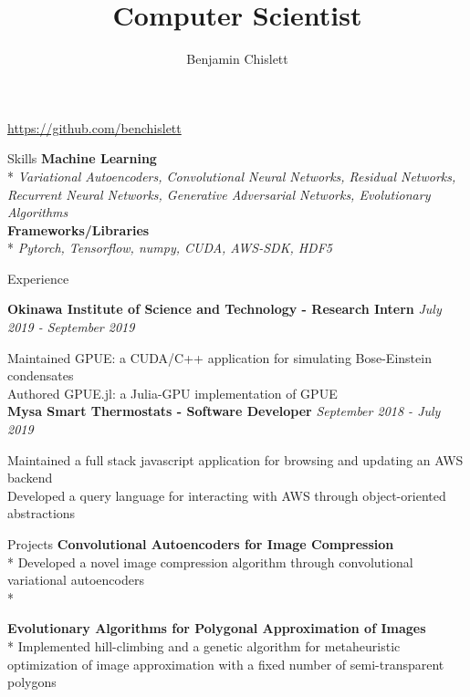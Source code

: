\documentclass[11pt, letterpaper]{article}
\title{Computer Scientist}
\author{Benjamin Chislett}
\date{}
\begin{document}
\begin{center}
  \Huge\theauthor
  \par
  \huge\thetitle
  \par
  \large\url{https://github.com/benchislett}
\end{center}

\begin{section}{Skills}
\textbf{Machine Learning}\\*
\textit{Variational Autoencoders, Convolutional Neural Networks, Residual Networks, Recurrent Neural Networks, Generative Adversarial Networks, Evolutionary Algorithms}\\

\textbf{Frameworks/Libraries}\\*
\textit{Pytorch, Tensorflow, numpy, CUDA, AWS-SDK, HDF5}
\end{section}

\begin{section}{Experience}

\textbf{Okinawa Institute of Science and Technology - Research Intern}
\hfill
\textit{July 2019 - September 2019}

Maintained GPUE: a CUDA/C++ application for simulating Bose-Einstein condensates\\
Authored GPUE.jl: a Julia-GPU implementation of GPUE\\

\textbf{Mysa Smart Thermostats - Software Developer}
\hfill
\textit{September 2018 - July 2019}

Maintained a full stack javascript application for browsing and updating an AWS backend\\
Developed a query language for interacting with AWS through object-oriented abstractions
\end{section}

\begin{section}{Projects}
\textbf{Convolutional Autoencoders for Image Compression}\\*
Developed a novel image compression algorithm through convolutional variational autoencoders\\*

\textbf{Evolutionary Algorithms for Polygonal Approximation of Images}\\*
Implemented hill-climbing and a genetic algorithm for metaheuristic optimization of image approximation with a fixed number of semi-transparent polygons\\

\end{section}
\end{document}

